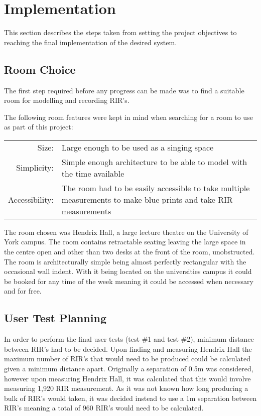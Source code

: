 \documentclass[../../main.tex]{subfiles}
\begin{document}
	\section{Implementation}
	This section describes the steps taken from setting the project objectives to reaching the final implementation of the desired system.

	\subsection{Room Choice}
	\label{roomChoice}

		The first step required before any progress can be made was to find a suitable room for modelling and recording \ac{RIR}'s.

		The following room features were kept in mind when searching for a room to use as part of this project:
		\begin{center}
		\begin{tabular}{r p{12cm}}
			Size: & Large enough to be used as a singing space \\
			Simplicity: & Simple enough architecture to be able to model with the time available \\
			Accessibility: & The room had to be easily accessible to take  multiple measurements to make blue prints and take \ac{RIR} measurements
		\end{tabular}
		\end{center}

		\vspace{5mm}

		The room chosen was Hendrix Hall, a large lecture theatre on the University of York campus. The room contains retractable seating leaving the large space in the centre open and other than two desks at the front of the room, unobstructed. The room is architecturally simple being almost perfectly rectangular with the occasional wall indent. With it being located on the universities campus it could be booked for any time of the week meaning it could be accessed when necessary and for free.

	\subsection{User Test Planning}
	\label{Background:RIRPositions}

		In order to perform the final user tests (test \#1 and test \#2), minimum distance between \ac{RIR}'s had to be decided. Upon finding and measuring Hendrix Hall the maximum number of \ac{RIR}'s that would need to be produced could be calculated given a minimum distance apart. Originally a separation of 0.5m was considered, however upon measuring Hendrix Hall, it was calculated that this would involve measuring 1,920 \ac{RIR} measurement. As it was not known how long producing a bulk of \ac{RIR}'s would taken, it was decided instead to use a 1m separation between \ac{RIR}'s meaning a total of 960 \ac{RIR}'s would need to be calculated.
\end{document}
